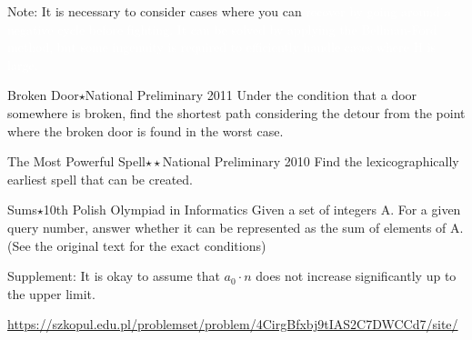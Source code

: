 Note: It is necessary to consider cases where you can \textcolor{white}{recover by going around a negative cycle before fighting. It can be solved by applying the Bellman-Ford method, but some ingenuity is required to efficiently handle cases where H is large.}

\begin{pbox}{Broken Door$\star$}{National Preliminary 2011}
Under the condition that a door somewhere is broken, find the shortest path considering the detour from the point where the broken door is found in the worst case.

\end{pbox}

\begin{pbox}{The Most Powerful Spell$\star\star$}{National Preliminary 2010}
Find the lexicographically earliest spell that can be created.

\end{pbox}

\begin{pbox}{Sums$\star$}{10th Polish Olympiad in Informatics}
Given a set of integers A. For a given query number, answer whether it can be represented as the sum of elements of A. (See the original text for the exact conditions)

Supplement: It is okay to assume that $a_0 \cdot n$ does not increase significantly up to the upper limit.

\url{https://szkopul.edu.pl/problemset/problem/4CirgBfxbj9tIAS2C7DWCCd7/site/}
\end{pbox}